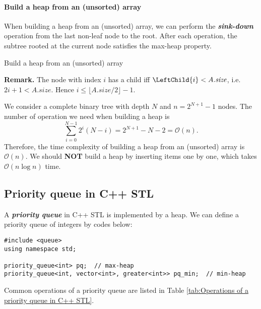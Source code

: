 \documentclass[12pt,a4paper]{ctexart}
\newcommand{\highlight}[1]{\textbf{\textit{#1}}}
\renewcommand{\leq}{\leqslant}
\begin{document}
    \paragraph{Build a heap from an (unsorted) array}

    When building a heap from an (unsorted) array, we can perform the \highlight{sink-down} operation from the last non-leaf node to the root. After each operation, the subtree rooted at the current node satisfies the max-heap property.

    \begin{algorithm}[!htbp]
        \caption{Build a heap from an (unsorted) array}
        \label{algo:Build a heap from an (unsorted) array}

    \end{algorithm}

    {\bf Remark. }The node with index $i$ has a child iff $\LeftChild{i} < A.\textit{size}$, i.e. $2i+1<A.\textit{size}$. Hence $i\leq\lfloor A.\textit{size}/2\rfloor-1$.

    We consider a complete binary tree with depth $N$ and $n=2^{N+1}-1$ nodes. The number of operation we need when building a heap is
    $$\sum_{i=0}^{N-1}2^i(N-i)=2^{N+1}-N-2=\mathcal O(n).$$
    Therefore, the time complexity of building a heap from an (unsorted) array is $\mathcal O(n)$. We should {\bf NOT} build a heap by inserting items one by one, which takes $\mathcal O(n\log n)$ time.

    \subsection{Priority queue in C++ STL}

    A \highlight{priority queue} in C++ STL is implemented by a heap. We can define a priority queue of integers by codes below:

    {\small
    \begin{lstlisting}
#include <queue>
using namespace std;

priority_queue<int> pq;  // max-heap
priority_queue<int, vector<int>, greater<int>> pq_min;  // min-heap
    \end{lstlisting}}
    
    Common operations of a priority queue are listed in Table \ref{tab:Operations of a priority queue in C++ STL}.
\end{document}
